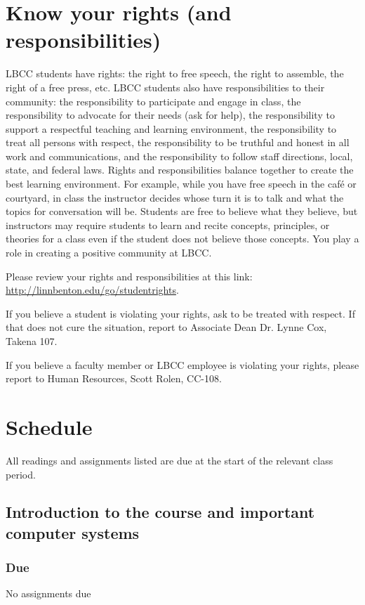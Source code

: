 \documentclass[12pt,article,oneside]{memoir}
\begin{document}
\section{Know your rights (and responsibilities)}

LBCC students have rights: the right to free speech, the right to assemble, the right of a free press, etc. LBCC students also have responsibilities to their community: the responsibility to participate and engage in class, the responsibility to advocate for their needs (ask for help), the responsibility to support a respectful teaching and learning environment, the responsibility to treat all persons with respect, the responsibility to be truthful and honest in all work and communications, and the responsibility to follow staff directions, local, state, and federal laws. Rights and responsibilities balance together to create the best learning environment. For example, while you have free speech in the café or courtyard, in class the instructor decides whose turn it is to talk and what the topics for conversation will be. Students are free to believe what they believe, but instructors may require students to learn and recite concepts, principles, or theories for a class even if the student does not believe those concepts. You play a role in creating a positive community at LBCC. 

Please review your rights and responsibilities at this link: \url{http://linnbenton.edu/go/studentrights}.

If you believe a student is violating your rights, ask to be treated with respect. If that does not cure the situation, report to Associate Dean Dr. Lynne Cox, Takena 107.

If you believe a faculty member or LBCC employee is violating your rights, please report to Human Resources, Scott Rolen, CC-108.

\newpage

\section{Schedule}

All readings and assignments listed are due at the start of the relevant class period.

\subsection{Introduction to the course and important computer systems}

\subsubsection{Due}
No assignments due
\end{document}
